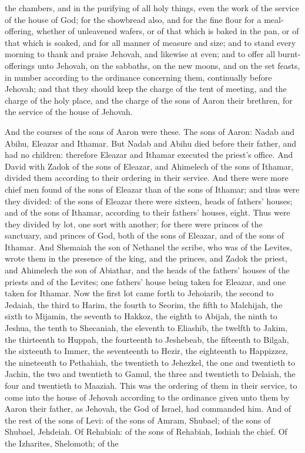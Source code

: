 the chambers, and in the purifying of all holy things, even the work of the service of the house of God; for the showbread also, and for the fine flour for a meal-offering, whether of unleavened wafers, or of that which is baked in the pan, or of that which is soaked, and for all manner of measure and size; and to stand every morning to thank and praise Jehovah, and likewise at even; and to offer all burnt-offerings unto Jehovah, on the sabbaths, on the new moons, and on the set feasts, in number according to the ordinance concerning them, continually before Jehovah; and that they should keep the charge of the tent of meeting, and the charge of the holy place, and the charge of the sons of Aaron their brethren, for the service of the house of Jehovah. 

And the courses of the sons of Aaron were these. The sons of Aaron: Nadab and Abihu, Eleazar and Ithamar. But Nadab and Abihu died before their father, and had no children: therefore Eleazar and Ithamar executed the priest’s office. And David with Zadok of the sons of Eleazar, and Ahimelech of the sons of Ithamar, divided them according to their ordering in their service. And there were more chief men found of the sons of Eleazar than of the sons of Ithamar; and thus were they divided: of the sons of Eleazar there were sixteen, heads of fathers’ houses; and of the sons of Ithamar, according to their fathers’ houses, eight. Thus were they divided by lot, one sort with another; for there were princes of the sanctuary, and princes of God, both of the sons of Eleazar, and of the sons of Ithamar. And Shemaiah the son of Nethanel the scribe, who was of the Levites, wrote them in the presence of the king, and the princes, and Zadok the priest, and Ahimelech the son of Abiathar, and the heads of the fathers’ houses of the priests and of the Levites; one fathers’ house being taken for Eleazar, and one taken for Ithamar.  Now the first lot came forth to Jehoiarib, the second to Jedaiah, the third to Harim, the fourth to Seorim, the fifth to Malchijah, the sixth to Mijamin, the seventh to Hakkoz, the eighth to Abijah, the ninth to Jeshua, the tenth to Shecaniah, the eleventh to Eliashib, the twelfth to Jakim, the thirteenth to Huppah, the fourteenth to Jeshebeab, the fifteenth to Bilgah, the sixteenth to Immer, the seventeenth to Hezir, the eighteenth to Happizzez, the nineteenth to Pethahiah, the twentieth to Jehezkel, the one and twentieth to Jachin, the two and twentieth to Gamul, the three and twentieth to Delaiah, the four and twentieth to Maaziah. This was the ordering of them in their service, to come into the house of Jehovah according to the ordinance given unto them by Aaron their father, as Jehovah, the God of Israel, had commanded him.  And of the rest of the sons of Levi: of the sons of Amram, Shubael; of the sons of Shubael, Jehdeiah. Of Rehabiah: of the sons of Rehabiah, Isshiah the chief. Of the Izharites, Shelomoth; of the 
